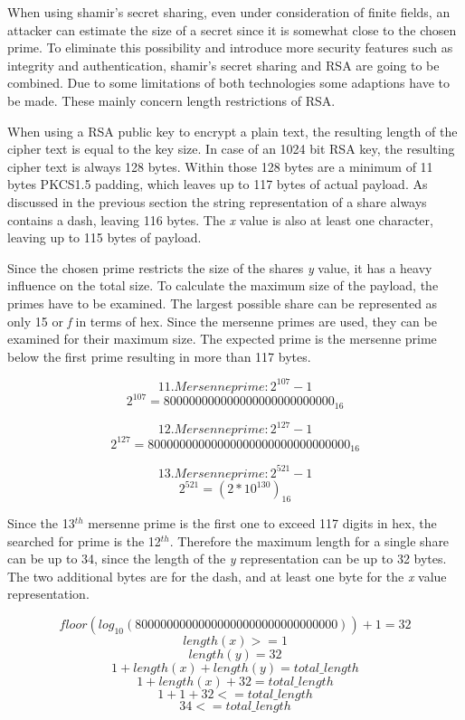 When using shamir's secret sharing, even under consideration of finite fields,
an attacker can estimate the size of a secret since it is somewhat close to the
chosen prime. To eliminate this possibility and introduce more security
features such as integrity and authentication, shamir's secret sharing and RSA
are going to be combined. Due to some limitations of both technologies some
adaptions have to be made. These mainly concern length restrictions of RSA.

When using a RSA public key to encrypt a plain text, the resulting length of
the cipher text is equal to the key size. In case of an 1024 bit RSA key, the
resulting cipher text is always 128 bytes. Within those 128 bytes are a minimum
of 11 bytes PKCS1.5 padding, which leaves up to 117 bytes of actual payload. As
discussed in the previous section the string representation of a share always
contains a dash, leaving 116 bytes. The \textit{x} value is also at least one
character, leaving up to 115 bytes of payload.

Since the chosen prime restricts the size of the shares \textit{y} value, it
has a heavy influence on the total size. To calculate the maximum size of the
payload, the primes have to be examined. The largest possible share can be
represented as only 15 or \textit{f} in terms of hex. Since the mersenne primes
are used, they can be examined for their maximum size. The expected prime is
the mersenne prime below the first prime resulting in more than 117 bytes.

$$11. Mersenne prime: 2^{107}-1$$
$$2^{107} = 800000000000000000000000000_{16}$$

$$12. Mersenne prime: 2^{127}-1$$
$$2^{127} = 80000000000000000000000000000000_{16}$$

$$13. Mersenne prime: 2^{521}-1$$
$$2^{521} = (2*10^{130})_{16}$$

Since the 13$^{th}$ mersenne prime is the first one to exceed 117 digits in
hex, the searched for prime is the 12$^{th}$. Therefore the maximum length for
a single share can be up to 34, since the length of the \textit{y}
representation can be up to 32 bytes. The two additional bytes are for the
dash, and at least one byte for the \textit{x} value representation.

$$floor(log_{10}(80000000000000000000000000000000)) + 1 = 32$$
$$length(x) >= 1$$
$$length(y) = 32$$
$$1 + length(x) + length(y) = total\_length$$
$$1 + length(x) + 32 = total\_length$$
$$1 + 1 + 32 <= total\_length$$
$$34 <= total\_length$$

